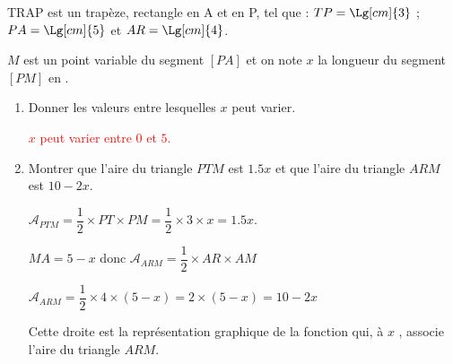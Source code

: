 \begin{corrige}
    TRAP est un trapèze, rectangle en A et en P, tel que :
    $TP=\Lg[cm]{3}$ ; $PA=\Lg[cm]{5}$ et $AR=\Lg[cm]{4}$.
    
    $M$ est un point variable du segment $[PA]$ et on note $x$ la longueur du segment $[PM]$ en \Lg[cm]{}.

    \begin{enumerate}
        \item Donner les valeurs entre lesquelles $x$ peut varier.
        
        \textcolor{red}{$x$ peut varier entre $0$ et $5$.}
        \item Montrer que l’aire du triangle $PTM$ est $\num{1,5}x$ et que l’aire du triangle $ARM$ est $10-2x$.
        
        {\color{red}%
        $\mathcal{A}_{PTM}=\dfrac12 \times PT \times PM=\dfrac12 \times 3 \times x=\num{1.5} x$.

        $MA = 5-x$ donc $\mathcal{A}_{ARM}=\dfrac12 \times AR \times AM$

        $\mathcal{A}_{ARM}=\dfrac12 \times 4 \times (5-x) = 2\times (5-x)= 10-2x$
        }
        Cette droite est la représentation graphique de la fonction qui, à $x$ , associe l’aire du triangle $ARM$.


\end{enumerate}
\end{corrige}
